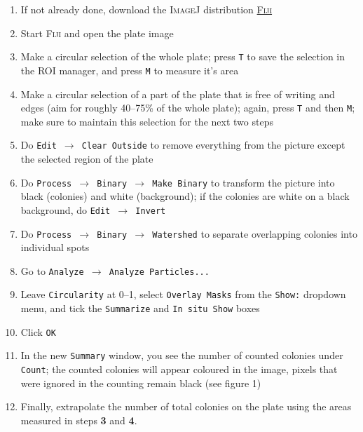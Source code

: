 \documentclass[11pt]{article}
\begin{document}
 	\begin{enumerate}
 		\item If not already done, download the \textsc{ImageJ} distribution \href{https://imagej.net/Fiji/Downloads}{\textsc{Fiji}}
 		\item Start \textsc{Fiji} and open the plate image
 		\item Make a circular selection of the whole plate; press \texttt{T} to save the selection in the ROI manager, and press \texttt{M} to measure it's area
 		\item Make a circular selection of a part of the plate that is free of writing and edges (aim for roughly 40--75\% of the whole plate); again, press \texttt{T} and then \texttt{M}; make sure to maintain this selection for the next two steps
 		\item Do \texttt{Edit $\rightarrow$ Clear Outside} to remove everything from the picture except the selected region of the plate
 		\item Do \texttt{Process $\rightarrow$ Binary $\rightarrow$ Make Binary} to transform the picture into black (colonies) and white (background); if the colonies are white on a black background, do \texttt{Edit $\rightarrow$ Invert}
 		\item Do \texttt{Process $\rightarrow$ Binary $\rightarrow$ Watershed} to separate overlapping colonies into individual spots
 		\item Go to \texttt{Analyze $\rightarrow$ Analyze Particles...}
 		\item Leave \texttt{Circularity} at 0--1, select \texttt{Overlay Masks} from the \texttt{Show:} dropdown menu, and tick the \texttt{Summarize} and \texttt{In situ Show} boxes
 		\item Click \texttt{OK}
 		\item In the new \texttt{Summary} window, you see the number of counted colonies under \texttt{Count}; the counted colonies will appear coloured in the image, pixels that were ignored in the counting remain black (see figure 1)
 		\item Finally, extrapolate the number of total colonies on the plate using the areas measured in steps \textbf{3} and \textbf{4}.
 	\end{enumerate}
 
\end{document}
